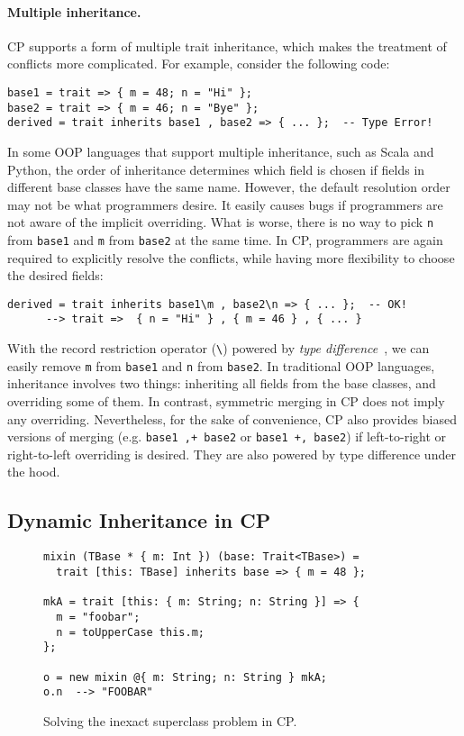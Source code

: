 \paragraph{Multiple inheritance.}
CP supports a form of multiple trait inheritance, which makes the treatment of
conflicts more complicated. For example, consider the following code:
\begin{lstlisting}
base1 = trait => { m = 48; n = "Hi" };
base2 = trait => { m = 46; n = "Bye" };
derived = trait inherits base1 , base2 => { ... };  -- Type Error!
\end{lstlisting}
In some OOP languages that support multiple inheritance, such as Scala and
Python, the order of inheritance determines which field is chosen if fields in
different base classes have the same name. However, the default resolution order
may not be what programmers desire. It easily causes bugs if programmers are not
aware of the implicit overriding. What is worse, there is no way to pick
\lstinline{n} from \lstinline{base1} and \lstinline{m} from \lstinline{base2} at
the same time. In CP, programmers are again required to explicitly resolve the
conflicts, while having more flexibility to choose the desired fields:
\begin{lstlisting}
derived = trait inherits base1\m , base2\n => { ... };  -- OK!
      --> trait =>  { n = "Hi" } , { m = 46 } , { ... }
\end{lstlisting}
With the record restriction operator (\lstinline{\}) powered by \emph{type
difference}~\citep{xu2023making}, we can easily remove \lstinline{m} from
\lstinline{base1} and \lstinline{n} from \lstinline{base2}. In traditional OOP
languages, inheritance involves two things: inheriting all fields from the base
classes, and overriding some of them. In contrast, symmetric merging in CP does
not imply any overriding. Nevertheless, for the sake of convenience, CP also
provides biased versions of merging (e.g. \lstinline{base1 ,+ base2} or
\lstinline{base1 +, base2}) if left-to-right or right-to-left overriding is
desired. They are also powered by type difference under the hood.

\subsection{Dynamic Inheritance in CP} \label{sec:dynamic}

\begin{figure}[b]
\begin{lstlisting}[xleftmargin=.2\textwidth]
mixin (TBase * { m: Int }) (base: Trait<TBase>) =
  trait [this: TBase] inherits base => { m = 48 };

mkA = trait [this: { m: String; n: String }] => {
  m = "foobar";
  n = toUpperCase this.m;
};

o = new mixin @{ m: String; n: String } mkA;
o.n  --> "FOOBAR"
\end{lstlisting}
\caption{Solving the inexact superclass problem in CP.}
\label{fig:inexactCP}
\end{figure}

